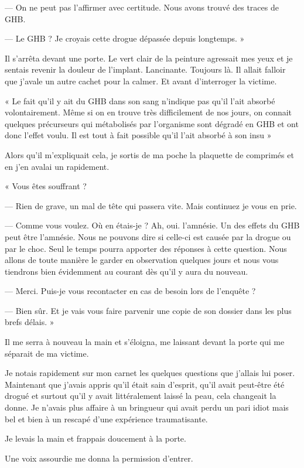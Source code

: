 — On ne peut pas l'affirmer avec certitude. Nous avons trouvé des traces de GHB.

— Le GHB ? Je croyais cette drogue dépassée depuis longtemps. »

Il s'arrêta devant une porte. Le vert clair de la peinture agressait mes yeux et je sentais revenir la douleur de
l'implant. Lancinante. Toujours là. Il allait falloir que j'avale un autre cachet pour la calmer. Et avant d'interroger
la victime.

« Le fait qu'il y ait du GHB dans son sang n'indique pas qu'il l'ait absorbé volontairement. Même si on en trouve très
difficilement de nos jours, on connait quelques précurseurs qui métabolisés par l'organisme sont dégradé en GHB et ont
donc l'effet voulu. Il est tout à fait possible qu'il l'ait absorbé à son insu »

Alors qu'il m'expliquait cela, je sortis de ma poche la plaquette de comprimés et en j'en avalai un rapidement.

« Vous êtes souffrant ?

— Rien de grave, un mal de tête qui passera vite. Mais continuez je vous en prie.

— Comme vous voulez. Où en étais-je ? Ah, oui. l'amnésie. Un des effets du GHB peut être l'amnésie. Nous ne pouvons
dire si celle-ci est causée par la drogue ou par le choc. Seul le temps pourra apporter des réponses à cette question.
Nous allons de toute manière le garder en observation quelques jours et nous vous tiendrons bien évidemment au courant
dès qu'il y aura du nouveau.

— Merci. Puis-je vous recontacter en cas de besoin lors de l'enquête ?

— Bien sûr. Et je vais vous faire parvenir une copie de son dossier dans les plus brefs délais. »

Il me serra à nouveau la main et s'éloigna, me laissant devant la porte qui me séparait de ma victime.

Je notais rapidement sur mon carnet les quelques questions que j'allais lui poser. Maintenant que j'avais appris qu'il
était sain d'esprit, qu'il avait peut-être été drogué et surtout qu'il y avait littéralement laissé la peau, cela 
changeait la donne. Je n'avais plus affaire à un bringueur qui avait perdu un pari idiot mais bel et bien à un 
rescapé d'une expérience traumatisante.

Je levais la main et frappais doucement à la porte.

Une voix assourdie me donna la permission d'entrer.

